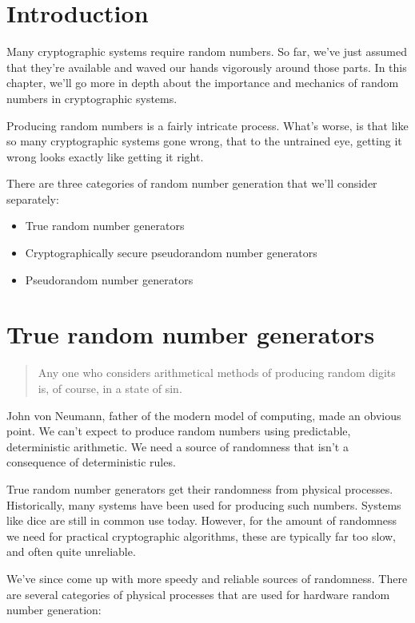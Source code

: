 \documentclass[11pt,ebook,table,dvipsnames]{memoir}
\begin{document}
\section{Introduction}
\label{sec-2-10-1}

Many cryptographic systems require random numbers. So far, we've just
assumed that they're available and waved our hands vigorously around
those parts. In this chapter, we'll go more in depth about the
importance and mechanics of random numbers in cryptographic systems.

Producing random numbers is a fairly intricate process. What's worse,
is that like so many cryptographic systems gone wrong, that to the
untrained eye, getting it wrong looks exactly like getting it right.

There are three categories of random number generation that we'll
consider separately:

\begin{itemize}
\item True random number generators
\item Cryptographically secure pseudorandom number generators
\item Pseudorandom number generators
\end{itemize}
\section{True random number generators}
\label{sec-2-10-2}

\begin{quotation}
Any one who considers arithmetical methods of producing random digits
is, of course, in a state of sin.
\end{quotation}

John von Neumann, father of the modern model of computing, made an
obvious point. We can't expect to produce random numbers using
predictable, deterministic arithmetic. We need a source of randomness
that isn't a consequence of deterministic rules.

True random number generators get their randomness from physical
processes. Historically, many systems have been used for producing
such numbers. Systems like dice are still in common use today.
However, for the amount of randomness we need for practical
cryptographic algorithms, these are typically far too slow, and often
quite unreliable.

We've since come up with more speedy and reliable sources of
randomness. There are several categories of physical processes that
are used for hardware random number generation:
\end{document}
